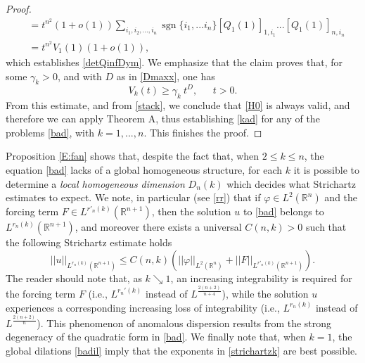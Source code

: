 \documentclass[11pt,letter]{amsart}
\def \R {\mathbb{R}}
\def \vf{\varphi}
\newcommand{\Rn}{\mathbb R^n}
\numberwithin{equation}{section}
\numberwithin{equation}{section}
\begin{document}
\begin{proof}
\begin{align*}
&=t^{n^{2}}(1+o(1))\sum_{i_{1},i_{2},...,i_{n}} \operatorname{sgn}\{i_{1},...i_{n}\}[Q_{1}(1)]_{1,i_{1}}...[Q_{1}(1)]_{n,i_{n}}
\\
&=t^{n^{2}}V_{1}(1)(1+o(1)), 
\end{align*}
which establishes \eqref{detQinfDym}.
We emphasize that the claim proves that, for some $\gamma_k>0$, and with $D$ as in \eqref{Dmaxx}, one has
\[
V_k(t)\ge \gamma_k\ t^{D},\ \ \ \ \ \ \ t>0.
\]
From this estimate, and from \eqref{stack}, we conclude that \eqref{H0} is always valid, and therefore we can apply Theorem A, thus establishing \eqref{kad} for any of the problems \eqref{bad}, with $k=1,...,n$.
This finishes the proof. 


 
\end{proof}

Proposition \ref{E:fan} shows that, despite the fact that, when $2\le k\le n$, the equation \eqref{bad} lacks of a global homogeneous structure, for each $k$ it is possible to determine a \emph{local homogeneous dimension} $D_n(k)$ which decides what Strichartz estimates to expect. 
We note, in particular (see \eqref{rr})  that if $\vf\in L^2(\Rn)$ and the forcing term $F\in L^{r'_n(k)}(\R^{n+1})$, then the solution $u$ to  \eqref{bad} belongs to $L^{r_n(k)}(\R^{n+1})$, and moreover there exists a universal $C(n,k)>0$ such that the following Strichartz estimate holds  
\begin{equation}\label{strichartzk}
||u||_{L^{r_n(k)}(\R^{n+1})} \le C(n,k) \left(||\vf||_{L^2(\Rn)} + ||F||_{L^{r'_n(k)}(\R^{n+1})}\right).
\end{equation}
The reader should note that, as $k\searrow 1$, an increasing integrability is required for the forcing term $F$ (i.e., $L^{r_n'(k)}$ instead of $L^{\frac{2(n+2)}{n+4}}$), while the solution $u$ experiences a corresponding increasing loss of integrability (i.e., $L^{r_n(k)}$ instead of $L^{\frac{2(n+2)}{n}}$).
This phenomenon of anomalous dispersion results from the strong degeneracy of the quadratic form in \eqref{bad}.
We finally note that, when $k=1$, the global dilations \eqref{badil} imply that the exponents in \eqref{strichartzk} are best possible. 

\medskip
\end{document}

